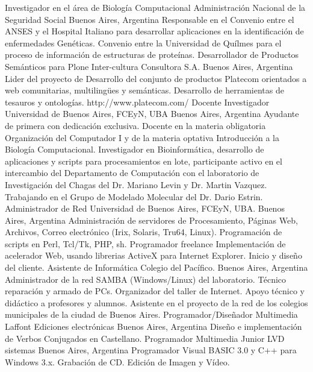 	{Investigador en el área de Biología Computacional}
	{Administración Nacional de la Seguridad Social}
	{Buenos Aires, Argentina}
	{}
	{Responsable en el Convenio entre el ANSES y el Hospital Italiano para desarrollar
	aplicaciones en la identificación de enfermedades Genéticas. Convenio entre la
	Universidad de Quílmes para el proceso de información de estructuras de proteínas.}
	{Desarrollador de Productos Semánticos para Plone}
	{Inter-cultura Consultora S.A.}
	{Buenos Aires, Argentina}
	{}
	{Lider del proyecto de Desarrollo del conjunto de productos Platecom
	orientados a web comunitarias, multilingües y semánticas. Desarrollo
	de herramientas de tesauros y ontologías. http://www.platecom.com/}
	{Docente Investigador}
	{Universidad de Buenos Aires, FCEyN, UBA}
	{Buenos Aires, Argentina}
	{}
	{Ayudante de primera con dedicación exclusiva.
	Docente en la materia obligatoria Organización del Computador I y de la
	materia optativa Introducción a la Biología Computacional.
	Investigador en Bioinformática, desarrollo de aplicaciones y scripts para
	procesamientos en lote, participante activo en el intercambio del Departamento
	de Computación con el laboratorio de Investigación del Chagas del
	Dr. Mariano Levin y Dr. Martin Vazquez. Trabajando en el Grupo de Modelado Molecular
	del Dr. Dario Estrin.}
	{Administrador de Red}
	{Universidad de Buenos Aires, FCEyN, UBA.}
	{Buenos Aires, Argentina}
	{}
	{Administración de servidores de Procesamiento, Páginas Web,
	Archivos, Correo electrónico (Irix, Solaris, Tru64, Linux).
	Programación de scripts en Perl, Tcl/Tk, PHP, sh.}
	{Programador freelance}
	{}
	{}
	{}
	{Implementación de acelerador Web, usando librerias ActiveX para Internet Explorer. Inicio y diseño del cliente.}
	{Asistente de Informática}
	{Colegio del Pacífico.}
	{Buenos Aires, Argentina}
	{}
	{Administrador de la red SAMBA (Windows/Linux) del
	laboratorio. Técnico reparación y armado de PCs. Organizador del taller de
	Internet. Apoyo técnico y didáctico a profesores y alumnos. Asistente en el
	proyecto de la red de los colegios municipales de la ciudad de Buenos Aires.}
	{Programador/Diseñador Multimedia}
	{Laffont Ediciones electrónicas}
	{Buenos Aires, Argentina}
	{}
	{Diseño e implementación de Verbos Conjugados en Castellano.}
	{Programador Multimedia Junior}
	{LVD sistemas}
	{Buenos Aires, Argentina}
	{}
	{Programador Visual BASIC 3.0 y C++ para Windows 3.x. Grabación de CD. Edición de Imagen y Vídeo.}
\label{profesional:hasta}

